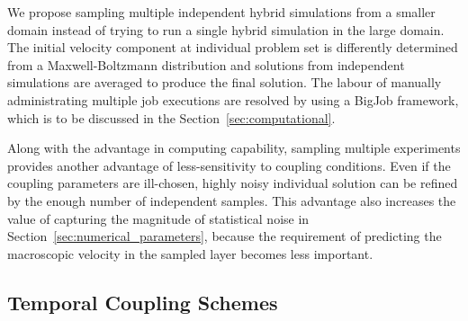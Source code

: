 \documentclass[preprint,12pt]{elsarticle}
\begin{document}
We propose sampling multiple independent hybrid simulations from a smaller domain instead of trying to run a single hybrid simulation in the large domain.
The initial velocity component at individual problem set is differently determined from a Maxwell-Boltzmann distribution and solutions from independent simulations are averaged to produce the final solution. The labour of manually administrating multiple job executions are resolved by using a BigJob framework, which is to be discussed in the Section~\ref{sec:computational}.

Along with the advantage in computing capability, sampling multiple experiments provides another advantage of less-sensitivity to coupling conditions. Even if the coupling parameters are ill-chosen, highly noisy individual solution can be refined by the enough number of independent samples. This advantage also increases the value of capturing the magnitude of statistical noise in Section~\ref{sec:numerical_parameters}, because the requirement of predicting the macroscopic velocity in the sampled layer becomes less important.


\subsection{Temporal Coupling Schemes}
\label{sec:numerical_temporal}
\end{document}
